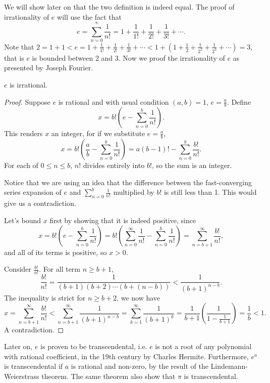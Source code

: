 \documentclass[main.tex]{subfiles}
\begin{document}
		We will show later on that the two definition is indeed equal. The proof of irrationality of $e$ will use the fact that 
		\begin{equation*}
			e = \sum_{n = 0}^{^\infty}\frac{1}{n!} = 1 + \frac{1}{1!} + \frac{1}{2!} + \frac{1}{3!} + \cdots.
		\end{equation*}
		Note that $2 = 1 + 1 < e = 1 + \frac{1}{1!} + \frac{1}{2!} + \frac{1}{3!} + \cdots < 1 + \left( 1 + \frac{1}{2} + \frac{1}{2^2} + \frac{1}{2^3} + \cdots\right) = 3$, that is $e$ is bounded between 2 and 3. Now we proof the irrationality of $e$ as presented by Joseph Fourier.
		\begin{theorem}
			$e$ is irrational.
		\end{theorem}
		\begin{proof}
			Suppose $e$ is rational and with usual condition $(a,b) = 1$, $e = \frac{a}{b}$. Define
			\begin{equation}
				x = b!\left(e - \sum_{n = 0}^{b} \frac{1}{n!}\right).
			\end{equation}
			This renders $x$ an integer, for if we substitute $e = \frac{a}{b}$,
			\begin{equation*}
				x = b!\left(\frac{a}{b} - \sum_{n = 0}^{b} \frac{1}{n!}\right) = a(b - 1)! - \sum_{n = 0}^{b} \frac{b!}{n!}.
			\end{equation*}
			For each of $0 \leq n \leq b$, $n!$ divides entirely into $b!$, so the sum is an integer.
			
			Notice that we are using an idea that the difference between the fast-converging series expansion of $e$ and $\sum_{n = 0}^{b} \frac{1}{n!}$ multiplied by $b!$ is still less than 1. This would give us a contradiction.
			
			Let's bound $x$ first by showing that it is indeed positive, since
			\begin{equation}
			x = b!\left(e - \sum_{n = 0}^{b} \frac{1}{n!}\right) = b!\left(\sum_{n = 0}^{\infty} \frac{1}{n!} - \sum_{n = 0}^{b} \frac{1}{n!}\right) = \sum_{n = b + 1}^{\infty} \frac{b!}{n!},
			\end{equation}
			and all of its terms is positive, so $x > 0$.
			
			Consider $\frac{b!}{n!}$. For all term $n \geq b + 1$,
			\begin{equation*}
				\frac{b!}{n!} = \frac{1}{(b + 1)(b + 2)\cdots(b + (n - b))} < \frac{1}{(b + 1)^{n - b}}.
			\end{equation*}
			The inequality is strict for $n \geq b + 2$, we now have
			\begin{equation}
				x = \sum_{n = b + 1}^{\infty} \frac{b!}{n!} < \sum_{n = b + 1}^{\infty} \frac{1}{(b + 1)^{n - b}} = \sum_{k = 1}^{\infty} \frac{1}{(b + 1)^{k}} = \frac{1}{b + 1}\left(\frac{1}{1 - \frac{1}{b + 1}}\right) = \frac{1}{b} < 1.
			\end{equation}
			A contradiction.
		\end{proof}
		Later on, $e$ is proven to be transcendental, i.e. $e$ is not a root of any polynomial with rational coefficient, in the 19th century by Charles Hermite. Furthermore, $e^a$ is transcendental if $a$ is rational and non-zero, by the result of the Lindemann-Weierstrass theorem. The same theorem also show that $\pi$ is transcendental.
		
\end{document}
